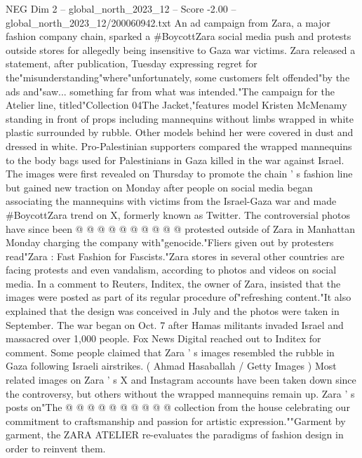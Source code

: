 \begin{textsample}{NEG Dim 2 – global\_north\_2023\_12 – Score -2.00 – global\_north\_2023\_12/200060942.txt}  \label{ex:f2_neg_329}
An ad campaign from Zara, a major fashion company chain, sparked a \#BoycottZara social media push and protests outside stores for allegedly being insensitive to Gaza war victims.
Zara released a statement, after publication, Tuesday expressing regret for the"misunderstanding"where"unfortunately, some customers felt offended"by the ads and"saw... something far from what was intended."The campaign for the Atelier line, titled"Collection 04The Jacket,"features model Kristen McMenamy standing in front of props including mannequins without limbs wrapped in white plastic surrounded by rubble.
Other models behind her were covered in dust and dressed in white.
Pro-Palestinian supporters compared the wrapped mannequins to the body bags used for Palestinians in Gaza killed in the war against Israel.
The images were first revealed on Thursday to promote the chain ' s fashion line but gained new traction on Monday after people on social media began associating the mannequins with victims from the Israel-Gaza war and made \#BoycottZara trend on X, formerly known as Twitter.
The controversial photos have since been @ @ @ @ @ @ @ @ @ @ protested outside of Zara in Manhattan Monday charging the company with"genocide."Fliers given out by protesters read"Zara : Fast Fashion for Fascists."Zara stores in several other countries are facing protests and even vandalism, according to photos and videos on social media.
In a comment to Reuters, Inditex, the owner of Zara, insisted that the images were posted as part of its regular procedure of"refreshing content."It also explained that the design was conceived in July and the photos were taken in September.
The war began on Oct. 7 after Hamas militants invaded Israel and massacred over 1,000 people.
Fox News Digital reached out to Inditex for comment.
Some people claimed that Zara ' s images resembled the rubble in Gaza following Israeli airstrikes. ( Ahmad Hasaballah / Getty Images ) Most related images on Zara ' s X and Instagram accounts have been taken down since the controversy, but others without the wrapped mannequins remain up.
Zara ' s posts on"The @ @ @ @ @ @ @ @ @ @ collection from the house celebrating our commitment to craftsmanship and passion for artistic expression.""Garment by garment, the ZARA ATELIER re-evaluates the paradigms of fashion design in order to reinvent them.

\end{textsample}
